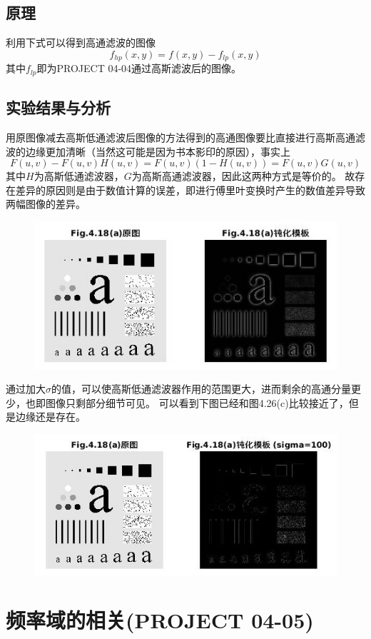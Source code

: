 \documentclass[logo,reportComp]{thesis}
\begin{document}
\subsection{原理}
利用下式可以得到高通滤波的图像
\[f_{hp}(x,y)=f(x,y)-f_{lp}(x,y)\]
其中$f_{lp}$即为PROJECT 04-04通过高斯滤波后的图像。

\subsection{实验结果与分析}
用原图像减去高斯低通滤波后图像的方法得到的高通图像要比直接进行高斯高通滤波的边缘更加清晰（当然这可能是因为书本影印的原因），事实上
\[F(u,v)-F(u,v)H(u,v)=F(u,v)(1-H(u,v))=F(u,v)G(u,v)\]
其中$H$为高斯低通滤波器，$G$为高斯高通滤波器，因此这两种方式是等价的。
故存在差异的原因则是由于数值计算的误差，即进行傅里叶变换时产生的数值差异导致两幅图像的差异。
\begin{figure}[H]
\centering
\includegraphics[width=0.8\linewidth]{fig/03.jpg}
\end{figure}

通过加大$\sigma$的值，可以使高斯低通滤波器作用的范围更大，进而剩余的高通分量更少，也即图像只剩部分细节可见。
可以看到下图已经和图4.26(c)比较接近了，但是边缘还是存在。
\begin{figure}[H]
\centering
\includegraphics[width=0.8\linewidth]{fig/04.jpg}
\end{figure}

\section{频率域的相关(PROJECT 04-05)}
\end{document}
